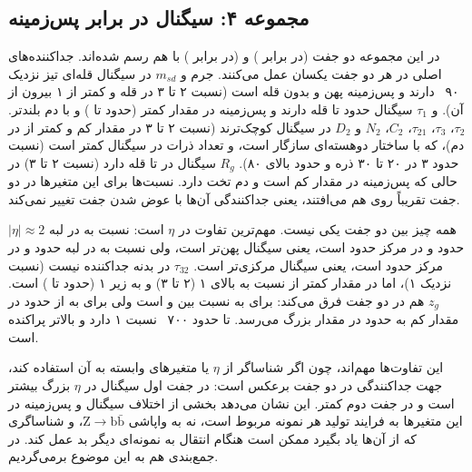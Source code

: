 \subsection{مجموعه ۴: سیگنال در برابر پس‌زمینه}
\label{sec:set4}
در این مجموعه دو جفت (\Zjet در برابر \bbbb) و (\ttZ در برابر \ttbb) با هم رسم شده‌اند. جداکننده‌های اصلی در هر دو جفت یکسان عمل می‌کنند. جرم و $m_{sd}$ در سیگنال قله‌ای تیز نزدیک ۹۰~ دارند و پس‌زمینه پهن و بدون قله است (نسبت ۲ تا ۳ در قله و کمتر از ۱ بیرون از آن).  و $\tau_1$ سیگنال حدود  تا  قله دارند و پس‌زمینه در مقدار کمتر (حدود  تا ) و با دم بلندتر. $\tau_2$، $\tau_3$، $\tau_{21}$، $C_2$، $N_2$ و $D_2$ در سیگنال کوچک‌ترند (نسبت ۲ تا ۳ در مقدار کم و کمتر از  در دم)، که با ساختار دو‌هسته‌ای سازگار است، و تعداد ذرات در سیگنال کمتر است (نسبت حدود ۳ در ۲۰ تا ۳۰ ذره و حدود  بالای ۸۰). $R_g$ سیگنال در  تا  قله دارد (نسبت ۲ تا ۳) در حالی که پس‌زمینه در مقدار کم است و دم تخت دارد. نسبت‌ها برای این متغیرها در دو جفت تقریباً روی هم می‌افتند، یعنی جداکنندگی آن‌ها با عوض شدن جفت تغییر نمی‌کند.

همه چیز بین دو جفت یکی نیست. مهم‌ترین تفاوت در $\eta$ است: نسبت \Zjet به \bbbb در لبه $|\eta|\approx2$ حدود  و در مرکز حدود  است، یعنی سیگنال پهن‌تر است، ولی نسبت \ttZ به \ttbb در لبه حدود  و در مرکز حدود  است، یعنی سیگنال مرکزی‌تر است. $\tau_{32}$ در بدنه جداکننده نیست (نسبت نزدیک ۱)، اما در مقدار کمتر از  نسبت \ttZ به \ttbb بالای ۱ (۲ تا ۳) و \Zjet به \bbbb زیر ۱ (حدود  تا ) است. $z_g$ هم در دو جفت فرق می‌کند: برای \Zjet به \bbbb نسبت بین  و  است ولی برای \ttZ به \ttbb از حدود  در مقدار کم به حدود  در مقدار بزرگ می‌رسد. \pt تا حدود ۷۰۰~ نسبت ۱ دارد و بالاتر پراکنده است.

این تفاوت‌ها مهم‌اند، چون اگر شناساگر از $\eta$ یا متغیرهای وابسته به آن استفاده کند، جهت جداکنندگی در دو جفت برعکس است: در جفت اول سیگنال در $\eta$ بزرگ بیشتر است و در جفت دوم کمتر. این نشان می‌دهد بخشی از اختلاف سیگنال و پس‌زمینه در این متغیرها به فرایند تولید هر نمونه مربوط است، نه به واپاشی $\mathrm{Z}\to\mathrm{b}\bar{\mathrm{b}}$، و شناساگری که از آن‌ها یاد بگیرد ممکن است هنگام انتقال به نمونه‌ای دیگر بد عمل کند. در جمع‌بندی هم به این موضوع برمی‌گردیم.

